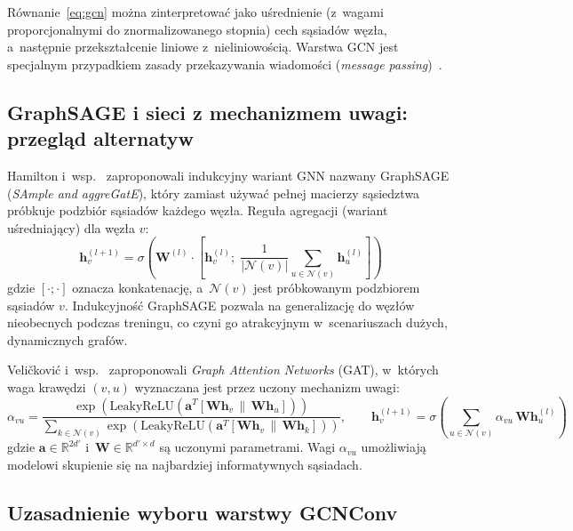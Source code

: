 \documentclass{SGGW-thesis}
\begin{document}
Równanie~\eqref{eq:gcn} można zinterpretować jako uśrednienie (z~wagami proporcjonalnymi do
znormalizowanego stopnia) cech sąsiadów węzła, a~następnie przekształcenie liniowe z~nieliniowością.
Warstwa GCN jest specjalnym przypadkiem zasady przekazywania wiadomości (\textit{message passing})~\cite{kipf2017}.

\subsection{GraphSAGE i sieci z mechanizmem uwagi: przegląd alternatyw}

Hamilton i~wsp.~\cite{hamilton2017} zaproponowali indukcyjny wariant GNN nazwany GraphSAGE
(\textit{SAmple and aggreGatE}), który zamiast używać pełnej macierzy sąsiedztwa próbkuje
podzbiór sąsiadów każdego węzła. Reguła agregacji (wariant uśredniający) dla węzła $v$:
\begin{equation}
    \mathbf{h}_v^{(l+1)} = \sigma\!\left(\mathbf{W}^{(l)} \cdot \left[\mathbf{h}_v^{(l)};\;
    \frac{1}{|\mathcal{N}(v)|}\sum_{u \in \mathcal{N}(v)} \mathbf{h}_u^{(l)}\right]\right)
    \label{eq:graphsage}
\end{equation}
gdzie $[\cdot;\cdot]$ oznacza konkatenację, a~$\mathcal{N}(v)$ jest próbkowanym podzbiorem sąsiadów $v$.
Indukcyjność GraphSAGE pozwala na generalizację do węzłów nieobecnych podczas treningu,
co czyni go atrakcyjnym w~scenariuszach dużych, dynamicznych grafów.

Veličković i~wsp.~\cite{velickovic2018} zaproponowali \textit{Graph Attention Networks} (GAT),
w~których waga krawędzi $(v, u)$ wyznaczana jest przez uczony mechanizm uwagi:
\begin{equation}
    \alpha_{vu} = \frac{\exp\!\left(\mathrm{LeakyReLU}\!\left(\mathbf{a}^T\left[\mathbf{W}\mathbf{h}_v \,\|\, \mathbf{W}\mathbf{h}_u\right]\right)\right)}
    {\displaystyle\sum_{k \in \mathcal{N}(v)} \exp\!\left(\mathrm{LeakyReLU}\!\left(\mathbf{a}^T\left[\mathbf{W}\mathbf{h}_v \,\|\, \mathbf{W}\mathbf{h}_k\right]\right)\right)},
    \qquad \mathbf{h}_v^{(l+1)} = \sigma\!\left(\sum_{u \in \mathcal{N}(v)} \alpha_{vu}\,\mathbf{W}\mathbf{h}_u^{(l)}\right)
    \label{eq:gat}
\end{equation}
gdzie $\mathbf{a} \in \mathbb{R}^{2d'}$ i~$\mathbf{W} \in \mathbb{R}^{d' \times d}$ są uczonymi parametrami.
Wagi $\alpha_{vu}$ umożliwiają modelowi skupienie się na najbardziej informatywnych sąsiadach.

\subsection{Uzasadnienie wyboru warstwy GCNConv}
\label{sec:gcn_choice}
\end{document}
